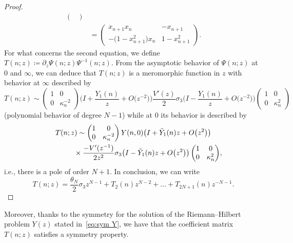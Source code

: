 \documentclass[pdftex]{sigma}%
\numberwithin{equation}{section}
\begin{document}
\begin{proof}
\begin{align*}
\begin{pmatrix}
		\end{pmatrix}
\\
&=\begin{pmatrix}
			x_{n+1}x_n&-x_{n+1}\\
			-\big(1-x_{n+1}^2\big)x_n&1-x_{n+1}^2
		\end{pmatrix}\!.
\end{align*}
		For what concerns the second equation, we define $T(n;z)\coloneqq \partial_z\Psi(n;z)\Psi^{-1}(n;z)$.
		From the asymptotic behavior of $\Psi(n;z)$ at $0$ and $\infty$, we can deduce that $T(n;z)$ is a meromorphic function in $z$ with behavior at $\infty$ described by
		\begin{equation*}
			T(n;z)\sim \begin{pmatrix}
				1&0\\
				0& \kappa_{n}^{-2}
			\end{pmatrix}\bigg(I+\frac{Y_1(n)}{z}+O\big(z^{-2}\big)\bigg)\frac{V'(z)}{2}\sigma_3
\bigg(I-\frac{Y_1(n)}{z}+O\big(z^{-2}\big)\bigg)\begin{pmatrix}
				1&0\\
				0& \kappa_{n}^{2}
			\end{pmatrix}
		\end{equation*}
		(polynomial behavior of degree $N-1$) while at $0$ its behavior is described by
		\begin{gather*}
T(n;z)\sim \begin{pmatrix}
			1&0\\
			0& \kappa_{n}^{-2}
		\end{pmatrix}Y(n,0)\big(I+\tilde{Y}_1(n)z+O\big(z^{2}\big)\big) \\
\hphantom{T(n;z)\sim}{}
\times \frac{-V'(z^{-1})}{2z^2}\sigma_3\big(I-\tilde{Y}_1(n)z+O\big(z^{2}\big)\big)\begin{pmatrix}
			1&0\\
			0& \kappa_{n}^{2}
		\end{pmatrix}\!,
\end{gather*}
		i.e., there is a pole of order $N+1$. In conclusion, we can write
		\begin{equation*}
T(n;z) = \frac{\theta_N}{2}\sigma_3z^{N-1}+T_2(n)z^{N-2}+\dots +T_{2N+1}(n)z^{-N-1}.\tag*{\qed}
\end{equation*}
\renewcommand{\qed}{}
\end{proof}

Moreover, thanks to the symmetry for the solution of the Riemann--Hilbert problem $Y(z)$ stated in~\eqref{eq:sym Y}, we have that the coefficient matrix $T(n;z)$ satisfies a symmetry property.
\end{document}
